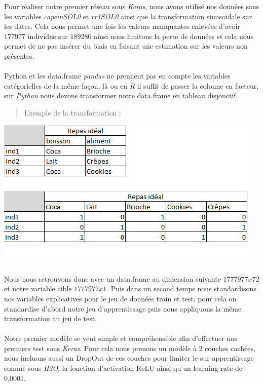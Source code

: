 \documentclass[14pt, openany]{article}
\begin{document}
Pour réaliser notre premier réseau sous \textit{Keras}, nous avons utilisé nos données sans les variables \textit{capeinSOL0} et \textit{rr1SOL0} ainsi que la transformation sinusoïdale sur les dates. Cela nous permet une fois les valeurs manquantes enlevées d'avoir $177977$ individus sur $189280$ ainsi nous limitons la perte de données et cela nous permet de ne pas insérer du biais en faisant une estimation sur les valeurs non présentes.

\paragraph{}
Python et les data.frame \textit{pandas} ne prennent pas en compte les variables catégorielles de la même façon, là ou en \textit{R} il suffit de passer la colonne en facteur, sur \textit{Python} nous devons transformer notre data.frame en tableau disjonctif.

\begin{quote}
    Exemple de la transformation :
\end{quote}
\begin{center}
\includegraphics[scale=0.7]{Images/tableaudisjonctif.png}
\end{center}

\paragraph{}
Nous nous retrouvons donc avec un data.frame au dimension suivante $1777977x72$ et notre variable cible $1777977x1$. Puis dans un second temps nous standardisons nos variables explicatives pour le jeu de données train et test, pour cela on standardise d'abord notre jeu d'apprentissage puis nous appliquons la même transformation au jeu de test.

\paragraph{}
Notre premier modèle se veut simple et compréhensible afin d'effectuer nos premiers test sous \textit{Keras}. Pour cela nous prenons un modèle à $2$ couches cachées, nous incluons aussi un DropOut de ces couches pour limiter le sur-apprentissage comme sous \textit{H2O}, la fonction d'activation ReLU ainsi qu'un learning rate de $0.0001$.
\end{document}
